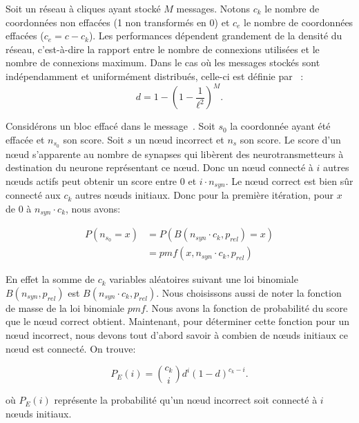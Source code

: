 \documentclass{gretsi}
\begin{document}
Soit un réseau à cliques ayant stocké $M$ messages. Notons $c_k$ le nombre de coordonnées non effacées (1 non transformés en 0) et $c_e$ le nombre de coordonnées effacées ($c_e = c-c_k$). Les performances dépendent grandement de la densité du réseau, c'est-à-dire la rapport entre le nombre de connexions utilisées et le nombre de connexions maximum. Dans le cas où les messages stockés sont indépendamment et uniformément distribués, celle-ci est définie par~\cite{} :
\begin{equation}
d = 1-\left(1-\frac{1}{\ell^2}\right)^M.
\end{equation}

Considérons un bloc effacé dans le message~. Soit $s_0$ la coordonnée ayant été effacée et $n_{s_{0}}$ son score. Soit $s$ un nœud incorrect et $n_s$ son score. Le score d'un nœud s'apparente au nombre de synapses qui libèrent des neurotransmetteurs à destination du neurone représentant ce nœud. Donc un nœud connecté à $i$ autres nœuds actifs peut obtenir un score entre $0$ et $i \cdot n_{syn}$. Le nœud correct est bien s\^ur connecté aux $c_k$ autres nœuds initiaux. Donc pour la première itération, pour $x$ de $0$ à $n_{syn} \cdot c_k$, nous avons:

\begin{equation}
\begin{split}
P(n_{s_0}=x) & = P\left(B(n_{syn}\cdot c_k, p_{rel})=x\right)\\
             & = pmf(x, n_{syn}\cdot c_k, p_{rel})
\end{split}
\end{equation}

En effet la somme de $c_k$ variables aléatoires suivant une loi binomiale $B(n_{syn}, p_{rel})$ est $B(n_{syn}\cdot c_k, p_{rel})$. Nous choisissons aussi de noter la fonction de masse de la loi binomiale $pmf$. Nous avons la fonction de probabilité du score que le nœud correct obtient. Maintenant, pour déterminer cette fonction pour un nœud incorrect, nous devons tout d'abord savoir à combien de nœuds initiaux ce nœud est connecté. On trouve:

\begin{equation}
P_E(i) = \binom{c_k}{i} d^i (1-d)^{{c_k}-i}.
\end{equation}

où $P_E(i)$ représente la probabilité qu'un nœud incorrect soit connecté à $i$ nœuds initiaux.
\end{document}
